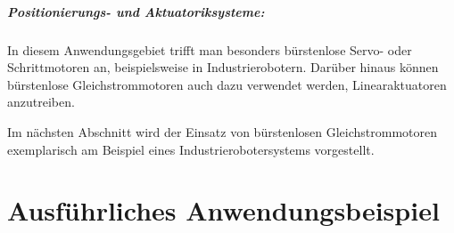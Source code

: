 \subparagraph{Positionierungs- und Aktuatoriksysteme:} In diesem Anwendungsgebiet trifft man besonders bürstenlose Servo- oder Schrittmotoren an, beispielsweise in Industrierobotern. Darüber hinaus können bürstenlose Gleichstrommotoren auch dazu verwendet werden, Linearaktuatoren anzutreiben.

Im nächsten Abschnitt wird der Einsatz von bürstenlosen Gleichstrommotoren exemplarisch am Beispiel eines Industrierobotersystems vorgestellt.

\section{Ausführliches Anwendungsbeispiel}

